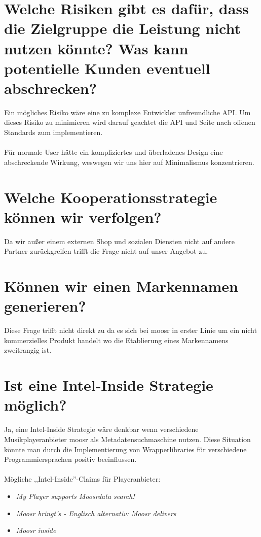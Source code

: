 \section{Welche Risiken gibt es dafür, dass die Zielgruppe die Leistung nicht nutzen könnte? Was kann potentielle Kunden eventuell abschrecken?}
Ein mögliches Risiko wäre eine zu komplexe Entwickler unfreundliche API. Um
dieses Risiko zu minimieren wird darauf geachtet die API und Seite nach offenen
Standards zum implementieren.
\\
\\
Für normale User hätte ein kompliziertes und überladenes Design eine
abschreckende Wirkung, weswegen wir uns hier auf Minimalismus konzentrieren.

\section{Welche Kooperationsstrategie können wir verfolgen?}
Da wir außer einem externen Shop und sozialen Diensten nicht auf andere Partner
zurückgreifen trifft die Frage nicht auf unser Angebot zu.

\section{Können wir einen Markennamen generieren?}
Diese Frage trifft nicht direkt zu da es sich bei moosr in erster Linie um ein
nicht kommerzielles Produkt handelt wo die Etablierung eines Markennamens
zweitrangig ist. 

\section{Ist eine Intel-Inside Strategie möglich?}
Ja, eine Intel-Inside Strategie wäre denkbar wenn verschiedene Musikplayeranbieter
moosr als Metadatensuchmaschine nutzen. Diese Situation könnte man durch die
Implementierung von Wrapperlibraries für verschiedene Programmiersprachen
positiv beeinflussen.
\\
\\
Mögliche ,,Intel-Inside''-Claims für Playeranbieter:
\begin{itemize}
    \item \it{My Player supports Moosrdata search!}
    \item \it{Moosr bringt's} - Englisch alternativ: \it{Moosr delivers}
    \item \it{Moosr inside}
\end{itemize}

